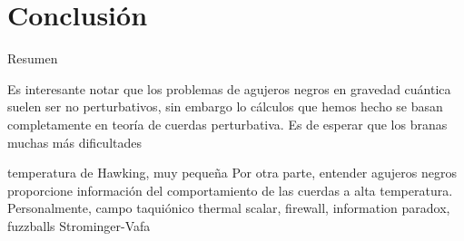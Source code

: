 \chapter{Conclusión}

Resumen

Es interesante notar que los problemas de agujeros negros en gravedad cuántica suelen ser
no perturbativos, sin embargo lo cálculos que hemos hecho se basan completamente en teoría de 
cuerdas perturbativa.
Es de esperar que los branas muchas más dificultades

temperatura de Hawking, muy pequeña 
Por otra parte, entender agujeros negros proporcione información del comportamiento de las
cuerdas a alta temperatura.
Personalmente, campo taquiónico thermal scalar, firewall, information paradox, fuzzballs
Strominger-Vafa


